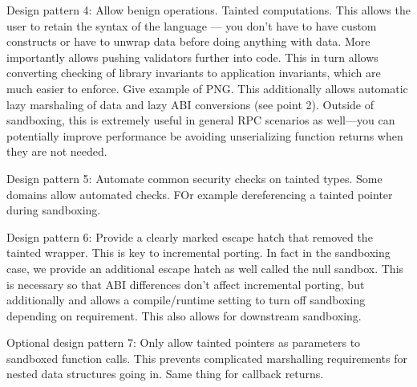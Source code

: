 {Design pattern 4: Allow benign operations. Tainted computations. This 
allows the user to retain the syntax of the language --- you don't have 
to have custom constructs or have to unwrap data before doing anything 
with data. More importantly allows pushing validators further into 
code. This in turn allows converting 
checking of library invariants to application invariants, which are 
much easier to enforce. Give example of PNG. This additionally allows 
automatic lazy marshaling of data and lazy ABI conversions (see point 
2). Outside of sandboxing, this is extremely useful in general RPC 
scenarios as well---you can potentially improve performance be avoiding 
unserializing function returns when they are not needed.

Design pattern 5: Automate common security checks on tainted types. 
Some domains allow automated checks. FOr example dereferencing a 
tainted pointer during sandboxing.

Design pattern 6: Provide a clearly marked escape hatch that removed 
the tainted wrapper. This is key to incremental porting. In fact in the 
sandboxing case, we provide an additional escape hatch as well called 
the null sandbox. This is necessary so that ABI differences don't 
affect incremental porting, but additionally and allows a 
compile/runtime setting to turn off sandboxing depending on 
requirement. This also allows for downstream sandboxing.

Optional design pattern 7: Only allow tainted pointers as parameters to 
sandboxed function calls. This prevents complicated marshalling 
requirements for nested data structures going in. Same thing for 
callback returns.
}